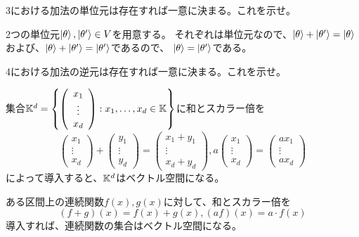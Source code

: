 \begin{Mondai}
  3における加法の単位元は存在すれば一意に決まる。これを示せ。
\end{Mondai}
\sol 2つの単位元$\ket{\theta},\ket{\theta'} \in V$を用意する。
それぞれは単位元なので、$\ket{\theta} + \ket{\theta'} = \ket{\theta}$および、$\ket{\theta} + \ket{\theta'} = \ket{\theta'}$であるので、
$\ket{\theta} = \ket{\theta'}$である。

\begin{Mondai}
  4における加法の逆元は存在すれば一意に決まる。これを示せ。
\end{Mondai}

\begin{reidai}
  集合$\mathbb{K}^d = \left\{\left(\begin{array}{c} x_1\\ \vdots \\ x_d \end{array}\right) : x_1, \ldots, x_d \in \mathbb{K} \right\}$に和とスカラー倍を
  $$
  \left(\begin{array}{c} x_1\\ \vdots \\ x_d \end{array}\right) + \left(\begin{array}{c} y_1\\ \vdots \\ y_d \end{array}\right)=
  \left(\begin{array}{c} x_1+ y_1 \\ \vdots \\ x_d + y_d \end{array}\right),
  a\left(\begin{array}{c} x_1\\ \vdots \\ x_d \end{array}\right) = \left(\begin{array}{c} ax_1\\ \vdots \\ ax_d \end{array}\right)
  $$
  によって導入すると、$\mathbb{K}^d$はベクトル空間になる。
\end{reidai}

\begin{reidai}
  ある区間上の連続関数$f(x),g(x)$に対して、和とスカラー倍を
  $$
  (f+g)(x) = f(x) + g(x), (af)(x) = a\cdot f(x)
  $$
  導入すれば、連続関数の集合はベクトル空間になる。
\end{reidai}

